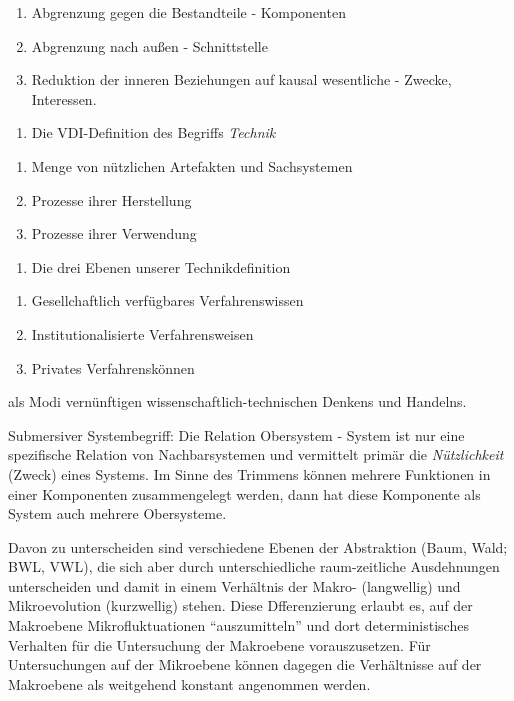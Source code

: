\documentclass[11pt,a4paper]{article}
\begin{document}
\begin{enumerate}
[noitemsep]
\item
  Abgrenzung gegen die Bestandteile - Komponenten
\item
  Abgrenzung nach außen - Schnittstelle
\item
  Reduktion der inneren Beziehungen auf kausal wesentliche - Zwecke,
  Interessen.
\end{enumerate}

\begin{enumerate}
[noitemsep]
\item
  Die VDI-Definition des Begriffs \emph{Technik}
\end{enumerate}

\begin{enumerate}
[noitemsep]
\item
  Menge von nützlichen Artefakten und Sachsystemen
\item
  Prozesse ihrer Herstellung
\item
  Prozesse ihrer Verwendung
\end{enumerate}

\begin{enumerate}
[noitemsep]
\item
  Die drei Ebenen unserer Technikdefinition
\end{enumerate}

\begin{enumerate}
[noitemsep]
\item
  Gesellchaftlich verfügbares Verfahrenswissen
\item
  Institutionalisierte Verfahrensweisen
\item
  Privates Verfahrenskönnen
\end{enumerate}

als Modi vernünftigen wissenschaftlich-technischen Denkens und Handelns.

Submersiver Systembegriff: Die Relation Obersystem - System ist nur eine
spezifische Relation von Nachbarsystemen und vermittelt primär die
\emph{Nützlichkeit} (Zweck) eines Systems. Im Sinne des Trimmens können
mehrere Funktionen in einer Komponenten zusammengelegt werden, dann hat
diese Komponente als System auch mehrere Obersysteme.

Davon zu unterscheiden sind verschiedene Ebenen der Abstraktion (Baum,
Wald; BWL, VWL), die sich aber durch unterschiedliche raum-zeitliche
Ausdehnungen unterscheiden und damit in einem Verhältnis der Makro-
(langwellig) und Mikroevolution (kurzwellig) stehen. Diese
Dfferenzierung erlaubt es, auf der Makroebene Mikrofluktuationen
``auszumitteln'' und dort deterministisches Verhalten für die
Untersuchung der Makroebene vorauszusetzen. Für Untersuchungen auf der
Mikroebene können dagegen die Verhältnisse auf der Makroebene als
weitgehend konstant angenommen werden.
\end{document}
